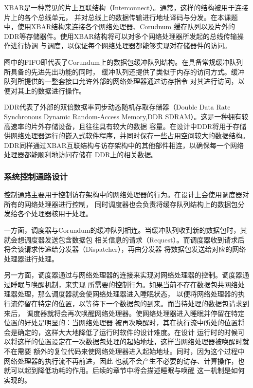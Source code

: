 XBAR是一种常见的片上互联结构（Interconnect）。通常，这样的结构被用于连接片上的各个总线单元，
并对总线上的数据传输进行地址译码与分发。在本课题中，使用XBAR结构来连接各个网络处理器、Corudnum
缓存队列以及片外的DDR等存储器件。使用XBAR结构将可以对多个网络处理器所发起的总线传输操作进行协调
与调度，以保证每个网络处理器都能够实现对存储器件的访问。

图中的FIFO即代表了Corundum上的数据包缓冲队列结构。在具备常规缓冲队列所具备的先进先出功能的同时，
缓冲队列还提供了类似于内存的访问方式。缓冲队列所提供的一整套接口允许外部的网络处理器通过访存指令
对其进行访问，以便对其上的数据进行操作。

DDR代表了外部的双倍数据率同步动态随机存取存储器（Double Data Rate Synchronous Dynamic
Random-Access Memory,DDR SDRAM）。这是一种拥有较高速率的片外存储设备，且往往具有较大的数据
容量。在设计中DDR将用于存储供网络处理器运行的嵌入式软件程序，并同时保存一些占用空间较大的数据结构。
DDR同样通过XBAR互联结构与访存架构中的其他部件相连，以确保每一个网络处理器都能顺利地访问存储在
DDR上的相关数据。

\subsubsection{系统控制通路设计}

控制通路主要用于控制访存架构中的网络处理器的行为。在设计上会使用调度器对所有的网络处理器进行控制，
同时调度器也会负责将缓存队列结构上的数据包分发给各个处理器核用于处理。


一方面，调度器与Corundum的缓冲队列相连。当缓冲队列收到新的数据包时，其就会想调度器发送包含数据包
相关信息的请求（Request）。而调度器收到请求后将会该请求传递给分发器（Dispatcher），再由分发器
将数据包发送给对应的网络处理器进行处理。

另一方面，调度器通过与网络处理器的连接来实现对网络处理器的控制。调度器通过睡眠与唤醒机制，来实现
所需要的控制行为。如果当前不存在数据包共网络处理器处理，那么调度器就会使网络处理器进入睡眠状态，
以便将网络处理器的执行流停留在特定的位置，以等待下一个数据包的到来。而当待处理的数据包请求到来后，
调度器就将会再次唤醒网络处理器。使网络处理器进入睡眠并停留在特定位置的好处是明显的：当网络处理器
被再次唤醒时，其在执行流中所处的位置将会是确定的，这样大大地降低了运行时软件的设计难度。在设计
运行时的时候可以将这样的位置设定在一次数据包处理的起始地址，这样当网络处理器被唤醒时就不在需要
额外的复位代码来使网络处理器进入起始地址。同时，因为这个过程中网络处理器的执行流不再前进，因此
也就不会产生不必要的访存、计算操作，也就可以起到降低功耗的作用。后续的章节中将会描述睡眠与唤醒
这一机制是如何实现的。

